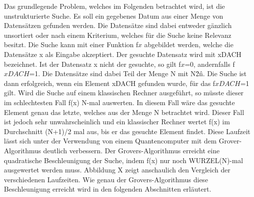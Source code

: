 Das grundlegende Problem, welches im Folgenden betrachtet wird, ist die unstrukturierte Suche. Es soll ein gegebenes Datum aus einer Menge von Datensätzen gefunden werden. Die Datensätze sind dabei entweder gänzlich unsortiert oder nach einem Kriterium, welches für die Suche keine Relevanz besitzt. Die Suche kann mit einer Funktion f\(x\) abgebildet werden, welche die Datensätze x als Eingabe akzeptiert. Der gesuchte Datensatz wird mit xDACH bezeichnet. Ist der Datensatz x nicht der gesuchte, so gilt f\(x\)=0, andernfalls f\( xDACH\)=1. Die Datensätze sind dabei Teil der Menge N mit N\=2\^n. Die Suche ist dann erfolgreich, wenn ein Element xDACH gefunden wurde, für das f\(xDACH\)=1 gilt.
Wird die Suche auf einem klassischen Rechner ausgeführt, so müsste dieser im schlechtesten Fall f(x) N-mal auswerten. In diesem Fall wäre das gesuchte Element genau das letzte, welches aus der Menge N betrachtet wird. Dieser Fall ist jedoch sehr unwahrscheinlich und ein klassischer Rechner wertet f(x) im Durchschnitt (N+1)/2 mal aus, bis er das gesuchte Element findet.
Diese Laufzeit lässt sich unter der Verwendung von einem Quantencomputer mit dem Grover-Algorithmus deutlich verbessern. Der Grovers-Algorithmus erreicht eine quadratische Beschleunigung der Suche, indem f(x) nur noch WURZEL(N)-mal ausgewertet werden muss. Abbildung X zeigt anschaulich den Vergleich der verschiedenen Laufzeiten. Wie genau der Grovers-Algorithmus diese Beschleunigung erreicht wird in den folgenden Abschnitten erläutert.